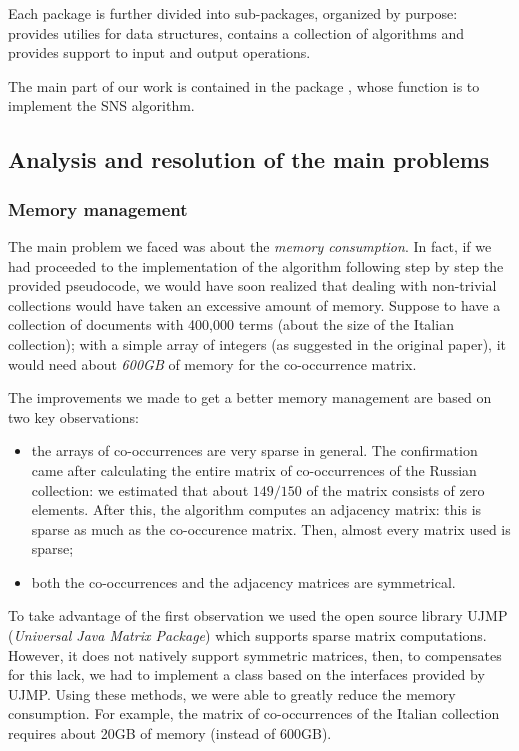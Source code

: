 		Each package is further divided into sub-packages, organized by purpose:  provides utilies for data structures,  contains a collection of algorithms and  provides support to input and output operations.

        The main part of our work is contained in the package , whose function is to implement the SNS algorithm.

    \subsection{Analysis and resolution of the main problems}
        \subsubsection{Memory management}\label{sec:memory-management}
            The main problem we faced was about the \emph{memory consumption}. In fact, if we had proceeded to the implementation of the algorithm following step by step the provided pseudocode, we would have soon realized that dealing with non-trivial collections would have taken an excessive amount of memory. Suppose to have a collection of documents with 400,000 terms (about the size of the Italian collection); with a simple array of integers (as suggested in the original paper), it would need about \emph{600GB} of memory for the co-occurrence matrix.

            The improvements we made to get a better memory management are based on two key observations:
            \begin{itemize}
                \item the arrays of co-occurrences are very sparse in general. The confirmation came after calculating the entire matrix of co-occurrences of the Russian collection: we estimated that about \(149/150\) of the matrix consists of zero elements. After this, the algorithm computes an adjacency matrix: this is sparse as much as the co-occurence matrix. Then, almost every matrix used is sparse;
                \item both the co-occurrences and the adjacency matrices are symmetrical.
            \end{itemize}

            To take advantage of the first observation we used the open source library UJMP (\emph{Universal Java Matrix Package})\cite{ujmp} which supports sparse matrix computations. However, it does not natively support symmetric matrices, then, to compensates for this lack, we had to implement a class based on the interfaces provided by UJMP. Using these methods, we were able to greatly reduce the memory consumption. For example, the matrix of co-occurrences of the Italian collection requires about 20GB of memory (instead of 600GB).


